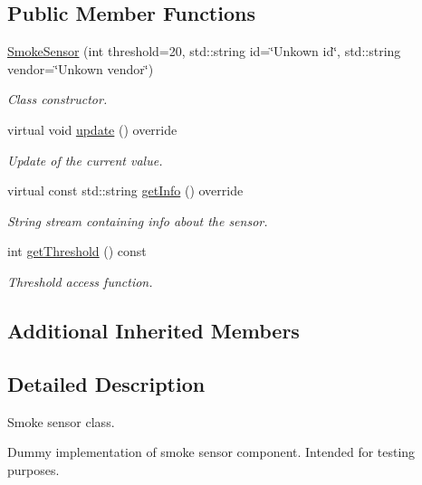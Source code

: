 \subsection*{Public Member Functions}
\begin{DoxyCompactItemize}
\item 
\hyperlink{classSmokeSensor_a0a8061f510440bd20f6ca7238b23516c}{Smoke\+Sensor} (int threshold=20, std\+::string id=\char`\"{}Unkown id\char`\"{}, std\+::string vendor=\char`\"{}Unkown vendor\char`\"{})
\begin{DoxyCompactList}\small\item\em Class constructor. \end{DoxyCompactList}\item 
virtual void \hyperlink{classSmokeSensor_a31bc900b0d1c5c893f8555fdcbe4266b}{update} () override
\begin{DoxyCompactList}\small\item\em Update of the current value. \end{DoxyCompactList}\item 
virtual const std\+::string \hyperlink{classSmokeSensor_ae7151069c8a66de157f9d66da631412c}{get\+Info} () override\hypertarget{classSmokeSensor_ae7151069c8a66de157f9d66da631412c}{}\label{classSmokeSensor_ae7151069c8a66de157f9d66da631412c}

\begin{DoxyCompactList}\small\item\em String stream containing info about the sensor. \end{DoxyCompactList}\item 
int \hyperlink{classSmokeSensor_add325306c6a33436bc9053721cbdb88b}{get\+Threshold} () const 
\begin{DoxyCompactList}\small\item\em Threshold access function. \end{DoxyCompactList}\end{DoxyCompactItemize}
\subsection*{Additional Inherited Members}


\subsection{Detailed Description}
Smoke sensor class. 

Dummy implementation of smoke sensor component. Intended for testing purposes. 

